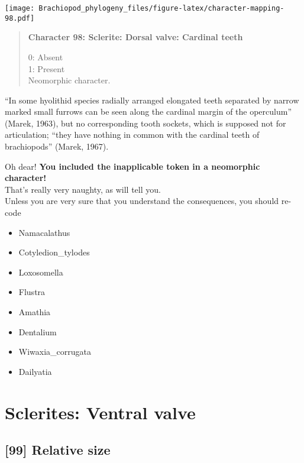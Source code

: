\documentclass[openany]{book}
\providecommand{\tightlist}{%
  \setlength{\itemsep}{0pt}\setlength{\parskip}{0pt}}
\theoremstyle{definition}
\theoremstyle{definition}
\theoremstyle{definition}
\theoremstyle{remark}
\begin{document}
\texttt{[image: Brachiopod\_phylogeny\_files/figure-latex/character-mapping-98.pdf]}

\begin{quote}
\textbf{Character 98: Sclerite: Dorsal valve: Cardinal teeth}

0: Absent\\
1: Present\\
Neomorphic character.
\end{quote}

``In some hyolithid species radially arranged elongated teeth separated
by narrow marked small furrows can be seen along the cardinal margin of
the operculum'' (Marek, 1963), but no corresponding tooth sockets, which
is supposed not for articulation; ``they have nothing in common with the
cardinal teeth of brachiopods'' (Marek, 1967).

Oh dear! \textbf{You included the inapplicable token in a neomorphic
character!}\\
That's really very naughty, as \citet{Brazeau2018} will tell you.\\
Unless you are very sure that you understand the consequences, you
should re-code

\begin{itemize}
\tightlist
\item
  Namacalathus\\
\item
  Cotyledion\_tylodes\\
\item
  Loxosomella\\
\item
  Flustra\\
\item
  Amathia\\
\item
  Dentalium\\
\item
  Wiwaxia\_corrugata\\
\item
  Dailyatia
\end{itemize}

\section{Sclerites: Ventral valve}\label{sclerites-ventral-valve}

\subsection*{{[}99{]} Relative size}\label{relative-size}
\end{document}
